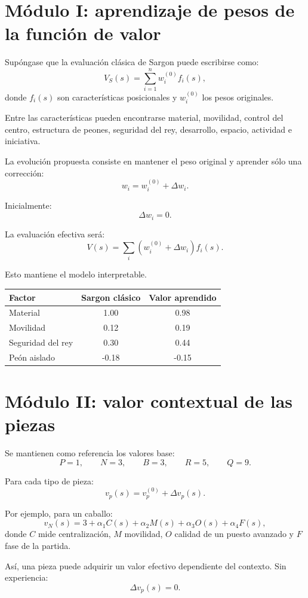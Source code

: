 \documentclass[11pt,a4paper]{article}
\begin{document}
\section{Módulo I: aprendizaje de pesos de la función de valor}
Supóngase que la evaluación clásica de Sargon puede escribirse como:
\[
V_S(s)=\sum_{i=1}^{n} w_i^{(0)} f_i(s),
\]
donde $f_i(s)$ son características posicionales y $w_i^{(0)}$ los pesos originales.

Entre las características pueden encontrarse material, movilidad, control del centro, estructura de peones, seguridad del rey, desarrollo, espacio, actividad e iniciativa.

La evolución propuesta consiste en mantener el peso original y aprender sólo una corrección:
\[
w_i = w_i^{(0)} + \Delta w_i.
\]

Inicialmente:
\[
\Delta w_i = 0.
\]

La evaluación efectiva será:
\[
V(s)=\sum_i
\left(w_i^{(0)}+\Delta w_i\right)f_i(s).
\]

Esto mantiene el modelo interpretable.

\begin{center}
\begin{tabular}{lcc}
\toprule
Factor & Sargon clásico & Valor aprendido \\
\midrule
Material & 1.00 & 0.98 \\
Movilidad & 0.12 & 0.19 \\
Seguridad del rey & 0.30 & 0.44 \\
Peón aislado & -0.18 & -0.15 \\
\bottomrule
\end{tabular}
\end{center}

\section{Módulo II: valor contextual de las piezas}
Se mantienen como referencia los valores base:
\[
P=1,\qquad N=3,\qquad B=3,\qquad R=5,\qquad Q=9.
\]

Para cada tipo de pieza:
\[
v_p(s)=v_p^{(0)}+\Delta v_p(s).
\]

Por ejemplo, para un caballo:
\[
v_N(s)
=
3+
\alpha_1 C(s)
+
\alpha_2 M(s)
+
\alpha_3 O(s)
+
\alpha_4 F(s),
\]
donde $C$ mide centralización, $M$ movilidad, $O$ calidad de un puesto avanzado y $F$ fase de la partida.

Así, una pieza puede adquirir un valor efectivo dependiente del contexto. Sin experiencia:
\[
\Delta v_p(s)=0.
\]
\end{document}
